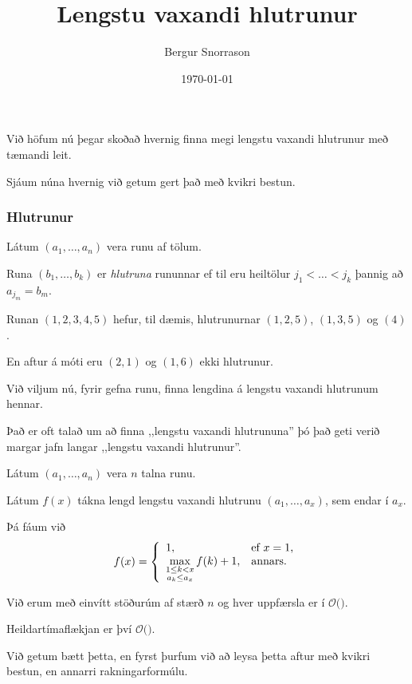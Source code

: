 \title{Lengstu vaxandi hlutrunur}
\author{Bergur Snorrason}
\date{\today}



\frame{\titlepage}

{
    {
        \item<1-> Við höfum nú þegar skoðað hvernig finna megi lengstu vaxandi hlutrunur með tæmandi leit.
        \item<2-> Sjáum núna hvernig við getum gert það með kvikri bestun.
    }
}

{
    \frametitle{Hlutrunur}
    {
        \item<1-> Látum $(a_1, \dots, a_n)$ vera runu af tölum.
        \item<2-> Runa $(b_1, \dots, b_k)$ er \emph{hlutruna} rununnar ef til eru heiltölur $j_1 < \dots < j_k$ þannig að $a_{j_m} = b_m$.
        \item<3-> Runan $(1, 2, 3, 4, 5)$ hefur, til dæmis, hlutrunurnar $(1, 2, 5)$, $(1, 3, 5)$ og $(4)$.
        \item<4-> En aftur á móti eru $(2, 1)$ og $(1, 6)$ ekki hlutrunur.
        \item<5-> Við viljum nú, fyrir gefna runu, finna lengdina á lengstu vaxandi hlutrunum hennar.
        \item<6-> Það er oft talað um að finna ,,lengstu vaxandi hlutrununa'' þó það geti verið margar jafn langar ,,lengstu vaxandi hlutrunur''.
    }
}

{
    {
        \item<1-> Látum $(a_1, \dots, a_n)$ vera $n$ talna runu.
        \item<2-> Látum $f(x)$ tákna lengd lengstu vaxandi hlutrunu $(a_1, \dots, a_x)$, sem endar í $a_x$.
        \item<3-> Þá fáum við
        \[
            f(x) = \left \{
            \env{array}
            { {l l}
                1, & \text{ef $x = 1$,} \\
                \displaystyle \max_{\substack{1 \leq k < x\\a_k \leq a_x}} f(k) + 1, & \text{annars.}
            }
            \right .
        \]
    }
}

{
}

{
    {
        \item<1-> Við erum með einvítt stöðurúm af stærð $n$ og hver uppfærsla er í $\mathcal{O}($$)$.
        \item<3-> Heildartímaflækjan er því $\mathcal{O}($$)$.
        \item<5-> Við getum bætt þetta, en fyrst þurfum við að leysa þetta aftur með kvikri bestun, en annarri rakningarformúlu.
    }
}

